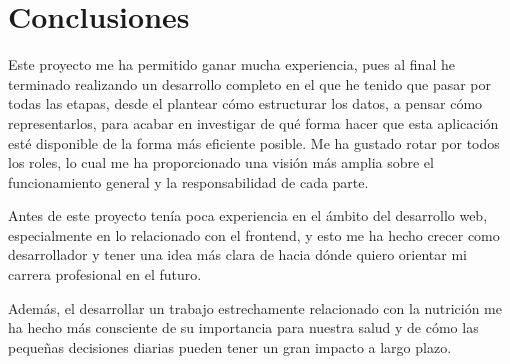 
\section{Conclusiones}
Este proyecto me ha permitido ganar mucha experiencia, pues al final he terminado realizando un desarrollo completo en el que he tenido que pasar por todas las etapas, desde el plantear cómo estructurar los datos, a pensar cómo representarlos, para acabar en investigar de qué forma hacer que esta aplicación esté disponible de la forma más eficiente posible. Me ha gustado rotar por todos los roles, lo cual me ha proporcionado una visión más amplia sobre el funcionamiento general y la responsabilidad de cada parte.

Antes de este proyecto tenía poca experiencia en el ámbito del desarrollo web, especialmente en lo relacionado con el frontend, y esto me ha hecho crecer como desarrollador y tener una idea más clara de hacia dónde quiero orientar mi carrera profesional en el futuro.

Además, el desarrollar un trabajo estrechamente relacionado con la nutrición me ha hecho más consciente de su importancia para nuestra salud y de cómo las pequeñas decisiones diarias pueden tener un gran impacto a largo plazo.


